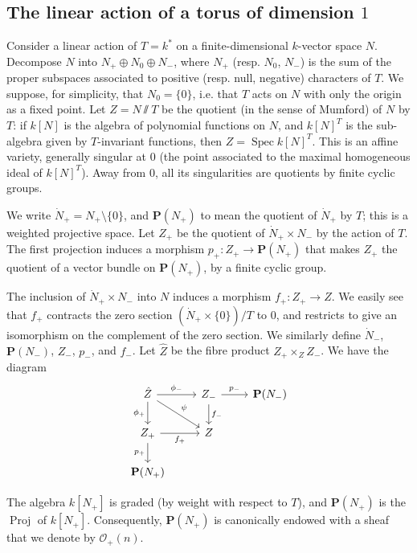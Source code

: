 \documentclass{article}
\theoremstyle{plain}
\theoremstyle{definition}
\newcommand{\scr}[1]{{\mathscr{#1}}}
\newcommand{\PP}{\mathbf{P}}
\DeclareMathOperator{\Spec}{Spec}
\DeclareMathOperator{\Proj}{Proj}
\newcommand{\oldpage}[1]{\marginpar{\footnotesize$\Big\vert$ \textit{p.~#1}}}
\begin{document}
\subsection{The linear action of a torus of dimension \texorpdfstring{$1$}{1}}
\label{2.1}

Consider a linear action of $T=k^*$ on a finite-dimensional $k$-vector space $N$.
Decompose $N$ into $N_+\oplus N_0\oplus N_-$, where $N_+$ (resp. $N_0$, $N_-$) is the sum of the proper subspaces associated to positive (resp. null, negative) characters of $T$.
We suppose, for simplicity, that $N_0=\{0\}$, i.e. that $T$ acts on $N$ with only the origin as a fixed point.
Let $Z=N \sslash T$ be the quotient (in the sense of Mumford) of $N$ by $T$: if $k[N]$ is the algebra of polynomial functions on $N$, and $k[N]^T$ is the sub-algebra given by $T$-invariant functions, then $Z=\Spec k[N]^T$.
This is an affine variety, generally singular at $0$ (the point associated to the maximal homogeneous ideal of $k[N]^T$).
Away from $0$, all its singularities are quotients by finite cyclic groups.

\oldpage{518}
We write $\dot{N}_+=N_+\setminus\{0\}$, and $\PP(N_+)$ to mean the quotient of $\dot{N}_+$ by $T$;
this is a weighted projective space.
Let $Z_+$ be the quotient of $\dot{N}_+\times N_-$ by the action of $T$.
The first projection induces a morphism $p_+\colon Z_+\to\PP(N_+)$ that makes $Z_+$ the quotient of a vector bundle on $\PP(N_+)$, by a finite cyclic group.

The inclusion of $\dot{N}_+\times N_-$ into $N$ induces a morphism $f_+\colon Z_+\to Z$.
We easily see that $f_+$ contracts the zero section $(\dot{N}_+\times\{0\})/T$ to $0$, and restricts to give an isomorphism on the complement of the zero section.
We similarly define $\dot{N}_-$, $\PP(N_-)$, $Z_-$, $p_-$, and $f_-$.
Let $\hat{Z}$ be the fibre product $Z_+\times_Z Z_-$.
We have the diagram
\[
  \begin{tikzcd}
    \hat{Z} \rar["\phi_-"] \dar[swap,"\phi_+"] \drar["\psi"]
    & Z_- \dar["f_-"] \rar["p_-"]
    & \PP(N_-)
  \\Z_+ \rar[swap,"f_+"] \dar[swap,"p_+"]
    & Z
  \\\PP(N_+)
  \end{tikzcd}
\]

The algebra $k[N_+]$ is graded (by weight with respect to $T$), and $\PP(N_+)$ is the $\Proj$ of $k[N_+]$.
Consequently, $\PP(N_+)$ is canonically endowed with a sheaf that we denote by $\scr{O}_+(n)$.
\end{document}
